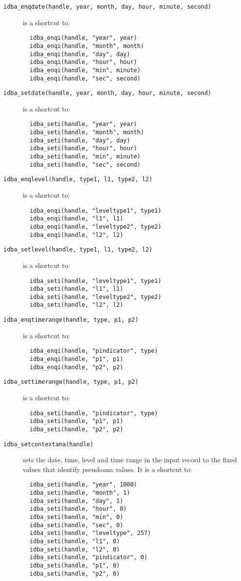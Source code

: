 \documentclass[final,12pt,a4paper,twoside]{book}
\begin{document}
\begin{description}
\item[{\tt idba\_enqdate(handle, year, month, day, hour, minute, second)}]
  is a shortcut to:
  \begin{verbatim}
  idba_enqi(handle, "year", year)
  idba_enqi(handle, "month", month)
  idba_enqi(handle, "day", day)
  idba_enqi(handle, "hour", hour)
  idba_enqi(handle, "min", minute)
  idba_enqi(handle, "sec", second)
  \end{verbatim}
\item[{\tt idba\_setdate(handle, year, month, day, hour, minute, second)}]
  is a shortcut to:
  \begin{verbatim}
  idba_seti(handle, "year", year)
  idba_seti(handle, "month", month)
  idba_seti(handle, "day", day)
  idba_seti(handle, "hour", hour)
  idba_seti(handle, "min", minute)
  idba_seti(handle, "sec", second)
  \end{verbatim}
\item[{\tt idba\_enqlevel(handle, type1, l1, type2, l2)}]
  is a shortcut to:
  \begin{verbatim}
  idba_enqi(handle, "leveltype1", type1)
  idba_enqi(handle, "l1", l1)
  idba_enqi(handle, "leveltype2", type2)
  idba_enqi(handle, "l2", l2)
  \end{verbatim}
\item[{\tt idba\_setlevel(handle, type1, l1, type2, l2)}]
  is a shortcut to:
  \begin{verbatim}
  idba_seti(handle, "leveltype1", type1)
  idba_seti(handle, "l1", l1)
  idba_seti(handle, "leveltype2", type2)
  idba_seti(handle, "l2", l2)
  \end{verbatim}
\item[{\tt idba\_enqtimerange(handle, type, p1, p2)}]
  is a shortcut to:
  \begin{verbatim}
  idba_enqi(handle, "pindicator", type)
  idba_enqi(handle, "p1", p1)
  idba_enqi(handle, "p2", p2)
  \end{verbatim}
\item[{\tt idba\_settimerange(handle, type, p1, p2)}]
  is a shortcut to:
  \begin{verbatim}
  idba_seti(handle, "pindicator", type)
  idba_seti(handle, "p1", p1)
  idba_seti(handle, "p2", p2)
  \end{verbatim}
\item[{\tt idba\_setcontextana(handle)}]
  sets the date, time, level and time range in the input record to the fixed
  values that identify pseudoana values.  It is a shortcut to:
  \begin{verbatim}
  idba_seti(handle, "year", 1000)
  idba_seti(handle, "month", 1)
  idba_seti(handle, "day", 1)
  idba_seti(handle, "hour", 0)
  idba_seti(handle, "min", 0)
  idba_seti(handle, "sec", 0)
  idba_seti(handle, "leveltype", 257)
  idba_seti(handle, "l1", 0)
  idba_seti(handle, "l2", 0)
  idba_seti(handle, "pindicator", 0)
  idba_seti(handle, "p1", 0)
  idba_seti(handle, "p2", 0)
  \end{verbatim}
\end{description}
\end{document}
